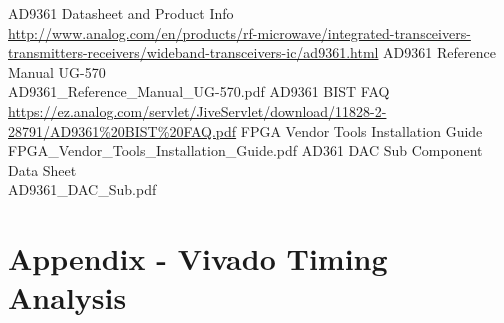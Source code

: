 \documentclass{article}
\begin{document}
\pagebreak
\begin{thebibliography}{1}

 AD9361 Datasheet and Product Info \\
\url{http://www.analog.com/en/products/rf-microwave/integrated-transceivers-transmitters-receivers/wideband-transceivers-ic/ad9361.html}
 AD9361 Reference Manual UG-570\\
AD9361\_Reference\_Manual\_UG-570.pdf
 AD9361 BIST FAQ \\
\url{https://ez.analog.com/servlet/JiveServlet/download/11828-2-28791/AD9361%20BIST%20FAQ.pdf}
 FPGA Vendor Tools Installation Guide \\
FPGA\_Vendor\_Tools\_Installation\_Guide.pdf
 AD361 DAC Sub Component Data Sheet \\AD9361\_DAC\_Sub.pdf

\end{thebibliography}
\pagebreak
\section{Appendix - Vivado Timing Analysis} \label{appendix}
\end{document}
